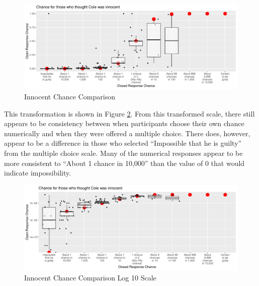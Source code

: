 \documentclass[print]{nuthesis}
\begin{document}
\begin{figure}

{\centering \includegraphics[width=\linewidth]{thesis_files/figure-latex/likecomp1-1} 

}

\caption{Innocent Chance Comparison}\label{fig:likecomp1}
\end{figure}

This transformation is shown in Figure \ref{fig:likecomp1scale}.
From this transformed scale, there still appears to be consistency between when participants choose their own chance numerically and when they were offered a multiple choice.
There does, however, appear to be a difference in those who selected ``Impossible that he is guilty'' from the multiple choice scale.
Many of the numerical responses appear to be more consistent to ``About 1 chance in 10,000'' than the value of 0 that would indicate impossibility.

\begin{figure}

{\centering \includegraphics[width=\linewidth]{thesis_files/figure-latex/likecomp1scale-1} 

}

\caption{Innocent Chance Comparison Log 10 Scale}\label{fig:likecomp1scale}
\end{figure}
\end{document}
